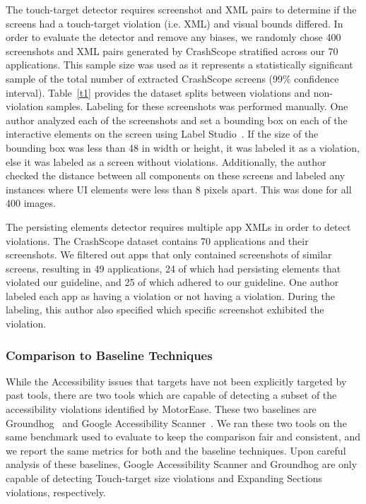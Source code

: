  The touch-target detector requires screenshot and XML pairs to determine if the screens had a touch-target violation (i.e. XML) and visual bounds differed. In order to evaluate the detector and remove any biases, we randomly chose 400 screenshots and XML pairs generated by CrashScope stratified across our 70 applications. This sample size was used as it represents a statistically significant sample of the total number of extracted CrashScope screens (99\% confidence interval). Table~\ref{t1} provides the dataset splits between violations and non-violation samples. Labeling for these screenshots was performed manually. One author analyzed each of the screenshots and set a bounding box on each of the interactive elements on the screen using Label Studio~\cite{LabelStudio}. If the size of the bounding box was less than 48 in width or height, it was labeled it as a violation, else it was labeled as a screen without violations. Additionally, the author checked the distance between all components on these screens and labeled any instances where UI elements were less than 8 pixels apart. This was done for all 400 images. 


The persisting elements detector requires multiple app XMLs in order to detect violations. The CrashScope dataset \cite{crashscope} contains 70 applications and their screenshots. We filtered out apps that only contained screenshots of similar screens, resulting in 49 applications, 24 of which had persisting elements that violated our guideline, and 25 of which adhered to our guideline. One author labeled each app as having a violation or not having a violation. During the labeling, this author also specified which specific screenshot exhibited the violation.

\subsubsection{Comparison to Baseline Techniques}

While the Accessibility issues that \MotorEase targets have not been explicitly targeted by past tools, there are two tools which are capable of detecting a subset of the accessibility violations identified by MotorEase. These two baselines are  Groundhog~\cite{Salehnamadi:ASE'22} and Google Accessibility Scanner~\cite{GoogleScanner}. We ran these two tools on the same \MotorCheck benchmark used to evaluate \MotorEase to keep the comparison fair and consistent, and we report the same metrics for both \MotorEase and the baseline techniques. Upon careful analysis of these baselines, Google Accessibility Scanner and Groundhog are only capable of detecting Touch-target size violations and Expanding Sections violations, respectively.

